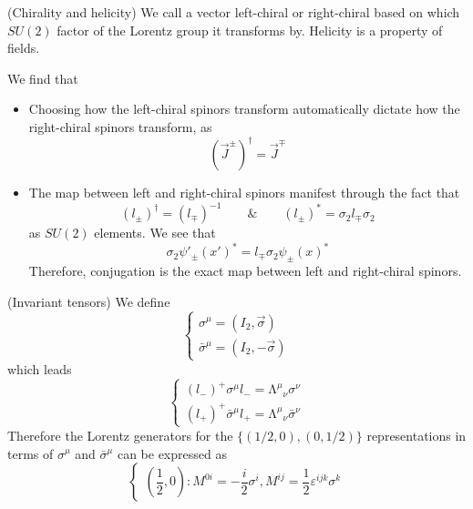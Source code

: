 \vspace{2ex}
\begin{defi}
(Chirality and helicity) We call a vector left-chiral or right-chiral based on which $SU(2)$ factor of the Lorentz group it transforms by. Helicity is a property of fields.
\end{defi}
\vspace{2ex}
\begin{lem}
We find that
\begin{itemize}
	\item[(i)] Choosing how the left-chiral spinors transform automatically dictate how the right-chiral spinors transform, as
		\[(\vec{J}^{\pm})^{\dagger}=\vec{J}^{\mp}\]
	\item[(ii)] The map between left and right-chiral spinors manifest through the fact that
		\[(l_{\pm})^{\dagger}=(l_{\mp})^{-1}\qquad\&\qquad (l_{\pm})^{*}=\sigma _{2}l_{\mp}\sigma _{2}\]
as $SU(2)$ elements. We see that
\[\sigma_2\psi '_{\pm}(x')^{*}=l_{\mp}\sigma _{2}\psi _{\pm}(x)^{*}\]
Therefore, conjugation is the exact map between left and right-chiral spinors.
\end{itemize}
\end{lem}
\vspace{2ex}

\begin{defi}
(Invariant tensors) We define
\[\begin{cases}
	\sigma ^{\mu }=(I_2,\vec{\sigma })\\
	\bar{\sigma }^{\mu }=(I_2,-\vec{ \sigma }) 
\end{cases}\]
which leads
\[\begin{cases}
	(l_{-})^{+}\sigma ^{\mu }l_{-}=\mathrm{\Lambda }^{\mu }{}_{\nu }\sigma ^{\nu }\\
	(l_{+})^{+}\bar{\sigma }^{\mu }l_{+}=\mathrm{\Lambda }^{\mu }{}_{\nu }\bar{\sigma }^{\nu }
\end{cases}\]
	Therefore the Lorentz generators for the $\{(1/2,0),(0,1/2)\}$ representations in terms of $\sigma ^{\mu }$ and $\bar{\sigma }^{\mu }$ can be expressed as
\[\begin{cases}
	(\dfrac{1}{2},0):M^{0i}=-\dfrac{i}{2}\sigma ^{i},M^{ij}=\dfrac{1}{2}\varepsilon ^{ijk}\sigma ^{k}
\end{cases}\]
\end{defi}
\vspace{2ex}


